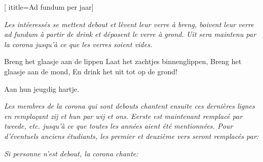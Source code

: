 [
ititle={Ad fundum per jaar}]

\emph{Les intéeressés se mettent debout et lèvent leur verre à \textit{breng}, boivent leur verre ad fundum à partir de
	\textit{drink} et déposent le verre à \textit{grond}.
	\textit{Uit} sera maintenu par la corona jusqu'à ce que les verres soient vides.}

\beginverse
{}
Breng het glaasje aan de lippen
Laat het zachtjes binnenglippen,
Breng het glaasje aan de mond,
En drink het uit tot op de grond!
\endverse

\beginverse
{}
Aan hun jeugdig hartje.
\endverse

\emph{Les membres de la corona qui sont debouts chantent ensuite ces dernières lignes en remplaçant \textit{zij} et
	\textit{hun} par \textit{wij} et \textit{ons}.
	\textit{Eerste} est maintenant remplacé par \textit{tweede}, etc. jusqu'à ce que toutes les années aient été
	mentionnées.
	Pour d'éventuels anciens étudiants, les premier et deuxième vers seront remplacés par:}

\beginverse
{}
\endverse

\emph{Si personne n'est debout, la corona chante:}

\beginverse
{}
\endverse
\endsong
	
	